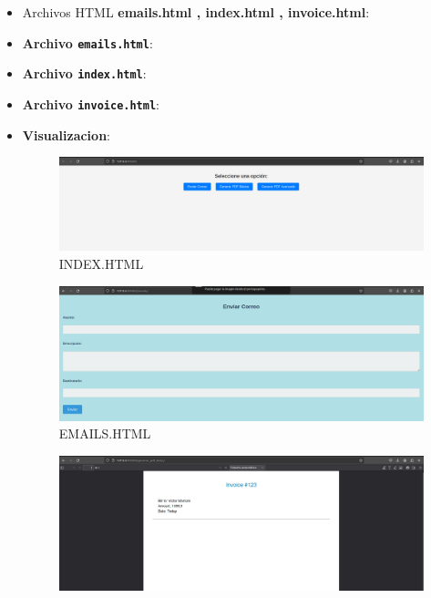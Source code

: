 \documentclass{article}
\begin{document}
    

    \begin{itemize}
        \item Archivos HTML \textbf{emails.html , index.html , invoice.html}:
        \item \textbf{Archivo \texttt{emails.html}}:
        
        \item \textbf{Archivo \texttt{index.html}}:
        
        \item \textbf{Archivo \texttt{invoice.html}}:
        
        \item \textbf{Visualizacion}:
        \begin{figure}[H]
            \centering
            \includegraphics[width=1.0\textwidth]{img/Cap6.png}
            \caption{INDEX.HTML}
        \end{figure}
        \begin{figure}[H]
            \centering
            \includegraphics[width=1.0\textwidth]{img/Cap7.png}
            \caption{EMAILS.HTML}
        \end{figure}
        \begin{figure}[H]
            \centering
            \includegraphics[width=1.0\textwidth]{img/Cap8.png}

\end{figure}
\end{itemize}
\end{document}
